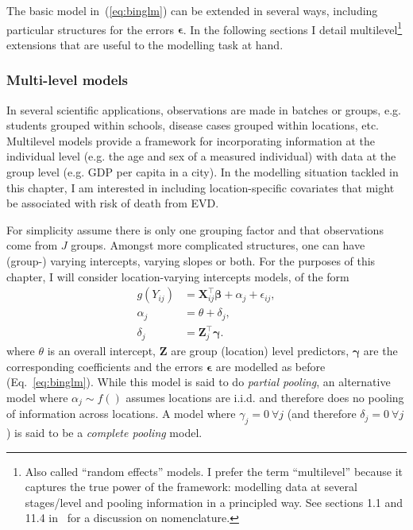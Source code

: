 The basic model in~(\ref{eq:binglm}) can be extended in several ways, including particular structures for the errors $\boldsymbol\epsilon$. 
In the following sections I detail multilevel\footnote{Also called ``random effects'' models. I prefer the term ``multilevel'' because it captures the true power of the framework: modelling data at several stages/level and pooling information in a principled way. See sections 1.1 and 11.4 in~\cite{Hill2007} for a discussion on nomenclature.} extensions that are useful to the modelling task at hand.

\subsubsection{Multi-level models}
\label{sec:multilevel}

In several scientific applications, observations are made in batches or groups, e.g. students grouped within schools, disease cases grouped within locations, etc.
Multilevel models provide a framework for incorporating information at the individual level (e.g. the age and sex of a measured individual) with data at the group level (e.g. GDP per capita in a city)\citep{Hill2007}.
In the modelling situation tackled in this chapter, I am interested in including location-specific covariates that might be associated with risk of death from EVD.

For simplicity assume there is only one grouping factor and that observations come from $J$ groups.
Amongst more complicated structures, one can have (group-) varying intercepts, varying slopes or both.
For the purposes of this chapter, I will consider location-varying intercepts models, of the form
\begin{align}
 \label{eq:varyingintA}
  g(Y_{ij}) &= \boldsymbol X_{ij}^\intercal \boldsymbol\beta + \alpha_j  + \epsilon_{ij},\\
  \alpha_j &= \theta + \delta_j, \\
   \label{eq:varyingintB}
  \delta_j &= \boldsymbol Z_j^\intercal \boldsymbol\gamma.
\end{align}
where $\theta$ is an overall intercept, $\boldsymbol Z$ are group (location) level predictors, $\boldsymbol\gamma$ are the corresponding coefficients and the errors $\boldsymbol\epsilon$ are modelled as before (Eq.~\ref{eq:binglm}).
While this model is said to do \textit{partial pooling}, an alternative model where $\alpha_j\sim f()$ assumes locations are i.i.d. and therefore does no pooling of information across locations.
A model where $\gamma_j = 0 \: \forall j$ (and therefore $\delta_j = 0 \: \forall j$) is said to be a \textit{complete pooling} model.

